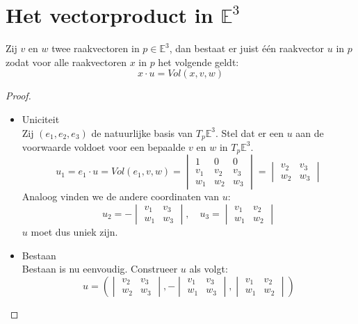 \documentclass[main.tex]{subfiles}
\begin{document}
\chapter{Het vectorproduct in $\mathbb{E}^{3}$}
\label{cha:het-vect-mathbb}

\begin{lem}
  Zij $v$ en $w$ twee raakvectoren in $p\in \mathbb{E}^{3}$, dan bestaat er juist \'e\'en raakvector $u$ in $p$ zodat voor alle raakvectoren $x$ in $p$ het volgende geldt:
  \[ x \cdot u = Vol(x,v,w) \]
  \begin{proof}
    \begin{itemize}
      Bewijs van uniek bestaan.
    \item Uniciteit\\
      Zij $(e_{1},e_{2},e_{3})$ de natuurlijke basis van $T_{p}\mathbb{E}^{3}$.
      Stel dat er een $u$ aan de voorwaarde voldoet voor een bepaalde $v$ en $w$ in $T_{p}\mathbb{E}^{3}$.
      \[
      u_{1} = e_{1}\cdot u = Vol(e_{1},v,w) = 
      \begin{vmatrix}
        1 & 0 & 0\\
        v_{1} & v_{2} & v_{3}\\
        w_{1} & w_{2} & w_{3}
      \end{vmatrix}
      =
      \begin{vmatrix}
        v_{2} & v_{3}\\
        w_{2} & w_{3}
      \end{vmatrix}
      \]
      Analoog vinden we de andere coordinaten van $u$:
      \[ 
      u_{2} = -
      \begin{vmatrix}
        v_{1} & v_{3}\\
        w_{1} & w_{3}
      \end{vmatrix}
      ,\quad
      u_{3} = 
      \begin{vmatrix}
        v_{1} & v_{2}\\
        w_{1} & w_{2}
      \end{vmatrix}
      \]
      $u$ moet dus uniek zijn.
    \item Bestaan\\
      Bestaan is nu eenvoudig.
      Construeer $u$ als volgt:
      \[ u = \left( 
        \begin{vmatrix}
          v_{2} & v_{3}\\
          w_{2} & w_{3}
        \end{vmatrix},
        -
        \begin{vmatrix}
          v_{1} & v_{3}\\
          w_{1} & w_{3}
        \end{vmatrix},
        \begin{vmatrix}
          v_{1} & v_{2}\\
          w_{1} & w_{2}
        \end{vmatrix}
      \right) \]
    \end{itemize}
  \end{proof}
\end{lem}
\end{document}
